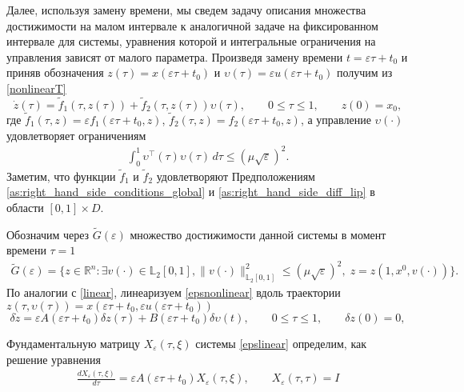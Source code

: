 \documentclass[../main.tex]{subfiles}
\begin{document}
	Далее, используя замену времени, мы сведем задачу описания множества достижимости на малом интервале к аналогичной задаче на фиксированном интервале для системы, уравнения которой и интегральные ограничения на управления зависят от малого параметра.
    Произведя замену времени
    $ t = \varepsilon \tau + t_0 $ и приняв обозначения $ z(\tau) = x(\varepsilon \tau + t_0) $ и $ \upsilon(\tau) = \varepsilon u(\varepsilon \tau + t_0) $  получим из \eqref{nonlinearT}
        \begin{equation}\label{epsnonlinear}
    	\dot{z}(\tau)=\widetilde{f}_1(\tau,z(\tau))+\widetilde{f}_2(\tau,z(\tau))\upsilon(\tau), \qquad 0 \leqslant \tau \leqslant 1, \qquad z(0) = x_0,
    \end{equation}
    где $ \widetilde{f}_1(\tau,z) = \varepsilon f_1(\varepsilon \tau + t_0,z) $, $ \widetilde{f}_2 (\tau,z) = f_2(\varepsilon \tau + t_0,z)$, а управление $ \upsilon(\cdot) $ удовлетворяет ограничениям
    \begin{gather}\label{epscond}
    	\int_0^1 \upsilon^{\top}(\tau) \upsilon(\tau) \, d\tau \leqslant \left( \mu \sqrt{\varepsilon}\right)^2.
    \end{gather}
    Заметим, что функции $\widetilde{f}_1$ и $\widetilde{f}_2$  удовлетворяют Предположениям  \ref{as:right_hand_side_conditions_global} и \ref{as:right_hand_side_diff_lip} в области $[0, 1]\times D$. 
    
    Обозначим через $\widetilde{G}(\varepsilon)$ множество достижимости данной системы в момент времени $\tau=1$
    \begin{gather*}
    	\widetilde{G}(\varepsilon)=\{z\in \mathbb{R}^n:\exists v(\cdot)\in \mathbb{L}_2[0,1],  \lVert v(\cdot)\rVert^2_{\mathbb{L}_2[0,1]}
    	\leqslant \left( \mu \sqrt{\varepsilon}\right)^2, \; z=z(1,x^0,v(\cdot))\}.
    \end{gather*}
    По аналогии с \eqref{linear}, линеаризуем \eqref{epsnonlinear} вдоль траектории $ z(\tau,\upsilon(\tau)) = x(\varepsilon \tau + t_0,\varepsilon u(\varepsilon \tau + t_0)) $
    \begin{equation}\label{epslinear}
    	\delta\dot{z} = \varepsilon A(\varepsilon \tau + t_0)\delta z(\tau) + B(\varepsilon \tau + t_0)\delta \upsilon(t),\qquad 0 \leqslant \tau \leqslant 1, \qquad \delta z(0) = 0,
    \end{equation}

	Фундаментальную матрицу $ X_{\varepsilon}(\tau,\xi) $ системы \eqref{epslinear} определим, как решение уравнения
\begin{gather*}
	\frac{dX_{\varepsilon}(\tau,\xi)}{d\tau} = \varepsilon A(\varepsilon \tau + t_0) X_{\varepsilon}(\tau,\xi), \qquad X_{\varepsilon}(\tau,\tau) = I
\end{gather*}
\end{document}
